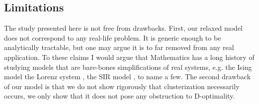 \subsection{Limitations}\label{subsec:limitations}
The study presented here is not free from drawbacks. First, our
relaxed model does not correspond to any real-life problem. It is
generic enough to be analytically tractable, but one may argue it is
to far removed from any real application. To these claims I would
argue that Mathematics has a long history of studying models that are
bare-bones simplifications of real systems, e.g. the Ising model
\cite{cipra1987} the Lorenz system \cite{brin}, the SIR model
\cite{keeling2008}, to name a few. The second drawback of our model is
that we do not show rigorously that clusterization necessarily occurs,
we only show that it does not pose any obstruction to D-optimality.


